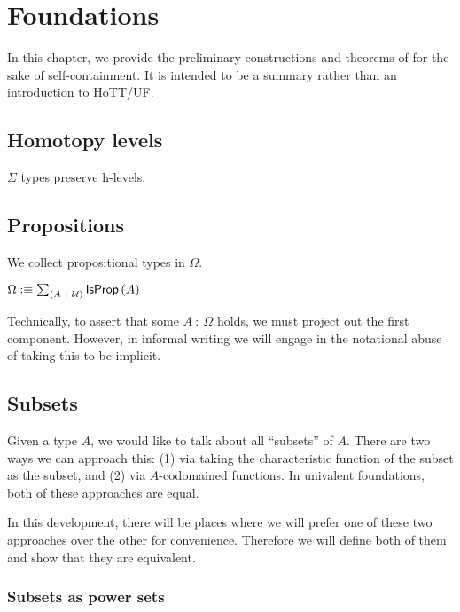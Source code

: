 \chapter{Foundations}\label{chap:foundations}

In this chapter, we provide the preliminary constructions and theorems of \UF{} for the
sake of self-containment. It is intended to be a summary rather than an introduction to
HoTT/UF.

\section{Homotopy levels}

\begin{prop}\label{isOfHLevelSigma}
  $\Sigma$ types preserve h-levels.
\end{prop}

\section{Propositions}

We collect propositional types in $\Omega$.

\begin{defn}\label{omega}
  $\Omega :\equiv \sum_{(A~:~\mathcal{U})} \mathsf{IsProp}\left(A\right)$
\end{defn}

Technically, to assert that some $A~:~\Omega$ holds, we must project out the first component.
However, in informal writing we will engage in the notational abuse of taking this to be
implicit.

\section{Subsets}

Given a type $A$, we would like to talk about all ``subsets'' of $A$. There are
two ways we can approach this: (1) via taking the characteristic function of the
subset as the subset, and (2) via $A$-codomained functions. In univalent
foundations, both of these approaches are equal.

In this development, there will be places where we will prefer one of these two
approaches over the other for convenience. Therefore we will define both of them
and show that they are equivalent.

\subsection{Subsets as power sets}

